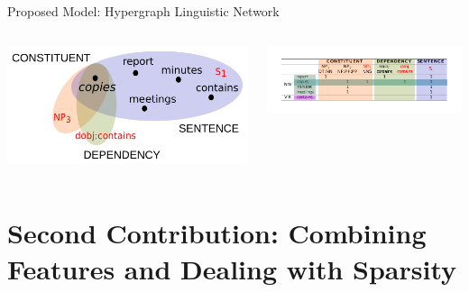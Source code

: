 \documentclass[10pt,xcolor=table]{beamer}
\begin{document}
\begin{frame}{Proposed Model: Hypergraph Linguistic Network}

	\begin{columns}
	\begin{minipage}[c][0.4\textheight][c]{\linewidth}
	  \centering
	  \includegraphics[width=.6\linewidth]{img/hypergraph_copies.pdf}
	\end{minipage}
	\begin{minipage}[c][0.5\textheight][c]{\linewidth}
		\centering
		\includegraphics[width=.9\linewidth]{img/incidence_aug.pdf}
	\end{minipage}
	\end{columns}
\end{frame}



\section{Second \bfseries{Contribution}: Combining Features and Dealing with Sparsity}

%
\end{document}
